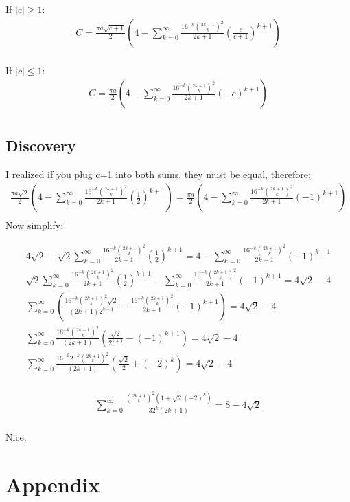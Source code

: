 \documentclass{article}
\begin{document}
If $|c| \geq 1$:
\begin{equation*}
\begin{split}
	C = \frac{\pi a\sqrt{c+1}}{2} \left(4 -
	\sum_{k=0}^{\infty} \frac{16^{-k}{{2k+1}\choose k}^2}{2k+1}\left(\frac{c}{c+1}\right)^{k+1}\right)\\
\end{split}
\end{equation*}

If $|c| \leq 1$:
\begin{equation*}
\begin{split}
	C = \frac{\pi a}{2}\left(4-\sum_{k=0}^{\infty}\frac{16^{-k}{{2k+1}\choose k}^2}{2k+1}(-c)^{k+1}\right)\\
\end{split}
\end{equation*}

\subsection{Discovery}
I realized if you plug c=1 into both sums, they must be equal, therefore:
\begin{equation*}
\begin{split}
	\frac{\pi a\sqrt{2}}{2} \left(4 -
	\sum_{k=0}^{\infty} \frac{16^{-k}{{2k+1}\choose k}^2}{2k+1}\left(\frac{1}{2}\right)^{k+1}\right)
	= \frac{\pi a}{2}\left(4-\sum_{k=0}^{\infty}\frac{16^{-k}{{2k+1}\choose k}^2}{2k+1}(-1)^{k+1}\right)\\
\end{split}
\end{equation*}
Now simplify:

\begin{equation*}
\begin{split}
	4\sqrt2 -
	\sqrt2\sum_{k=0}^{\infty} \frac{16^{-k}{{2k+1}\choose k}^2}{2k+1}\left(\frac{1}{2}\right)^{k+1}
	= 4-\sum_{k=0}^{\infty}\frac{16^{-k}{{2k+1}\choose k}^2}{2k+1}(-1)^{k+1}\\
	\sqrt2\sum_{k=0}^{\infty} \frac{16^{-k}{{2k+1}\choose k}^2}{2k+1}\left(\frac{1}{2}\right)^{k+1}
	-\sum_{k=0}^{\infty}\frac{16^{-k}{{2k+1}\choose k}^2}{2k+1}(-1)^{k+1}
	= 4\sqrt2 - 4\\
	\sum_{k=0}^{\infty} \left( \frac{16^{-k}{{2k+1}\choose k}^2\sqrt2}{(2k+1)2^{k+1}}
	- \frac{16^{-k}{{2k+1}\choose k}^2}{2k+1}(-1)^{k+1} \right)
	= 4\sqrt2 - 4\\
	\sum_{k=0}^{\infty} \frac{16^{-k}{{2k+1}\choose k}^2}{(2k+1)} \left( \frac{\sqrt2}{2^{k+1}} - (-1)^{k+1} \right)
	= 4\sqrt2 - 4\\
	\sum_{k=0}^{\infty} \frac{16^{-k}2^{-k}{{2k+1}\choose k}^2}{(2k+1)} \left( \frac{\sqrt2}{2} + (-2)^k \right)
	= 4\sqrt2 - 4\\
\end{split}
\end{equation*}

\begin{tcolorbox}
\begin{equation*}
\begin{split}
	\sum_{k=0}^{\infty} \frac{{{2k+1}\choose k}^2\left( 1 + \sqrt2(-2)^k \right)}{32^k(2k+1)} 
	= 8 - 4\sqrt2\\
\end{split}
\end{equation*}
\end{tcolorbox}
Nice.



\section{Appendix}
\end{document}
